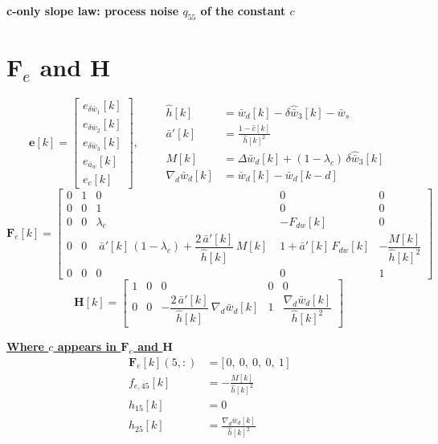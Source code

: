 \documentclass[11pt,a4paper]{ctexart}
\newcommand{\lc}{\lambda_c}
\newcommand{\ba}{\bar{a}}
\newcommand{\bw}{\bar{w}}
\newcommand{\ap}{\ba'}
\newcommand{\wh}{\hat{\bw}}
\newcommand{\hh}{\hat{h}}
\newcommand{\ch}{\hat{c}}
\newcommand{\hd}[1]{\par\bigskip\noindent\underline{\textbf{#1}}}
\begin{document}
\begin{center}\textbf{\large c-only slope law: process noise $q_{55}$ of the constant $c$}\end{center}

\section{$\mathbf{F}_e$ and $\mathbf{H}$}

\[
\mathbf{e}[k] = \begin{bmatrix} e_{\delta\bw_1}[k] \\ e_{\delta\bw_2}[k] \\ e_{\delta\bw_3}[k] \\ e_{\ba_w}[k] \\ e_c[k] \end{bmatrix},
\qquad
\begin{aligned}
\hh[k] &= \bw_d[k] - \delta\wh_3[k] - \bw_s \\
\ap[k] &= \frac{1 - \ch[k]}{\hh[k]^{2}} \\
M[k] &= \Delta\bw_d[k] + (1-\lc)\,\delta\wh_3[k] \\
\nabla_d\bw_d[k] &= \bw_d[k] - \bw_d[k-d]
\end{aligned}
\]
\[
\mathbf{F}_e[k] =
\begin{bmatrix}
0 & 1 & 0 & 0 & 0 \\
0 & 0 & 1 & 0 & 0 \\
0 & 0 & \lc & -F_{dw}[k] & 0 \\
0 & 0 & \;\ap[k]\,(1-\lc) + \dfrac{2\,\ap[k]}{\hh[k]}\,M[k]\; & 1 + \ap[k]\,F_{dw}[k] & -\dfrac{M[k]}{\hh[k]^{2}} \\
0 & 0 & 0 & 0 & 1
\end{bmatrix}
\]
\[
\mathbf{H}[k] =
\begin{bmatrix}
1 & 0 & 0 & 0 & 0 \\
0 & 0 & -\dfrac{2\,\ap[k]}{\hh[k]}\,\nabla_d\bw_d[k] & 1 & \dfrac{\nabla_d\bw_d[k]}{\hh[k]^{2}}
\end{bmatrix}
\]

\hd{Where $c$ appears in $\mathbf{F}_e$ and $\mathbf{H}$}
\[
\begin{aligned}
\mathbf{F}_e[k](5,:) &= \big[\,0,\ 0,\ 0,\ 0,\ 1\,\big] \\
f_{e,45}[k] &= -\frac{M[k]}{\hh[k]^{2}} \\
h_{15}[k] &= 0 \\
h_{25}[k] &= \frac{\nabla_d\bw_d[k]}{\hh[k]^{2}}
\end{aligned}
\]
\end{document}
